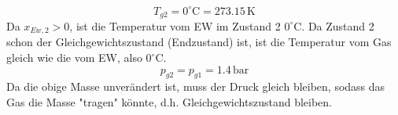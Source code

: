 

\item[b)]
    \[
    T_{g2} = 0^\circ \text{C} = 273.15 \, \text{K}
    \]
    Da \( x_{Ew,2} > 0 \), ist die Temperatur vom EW im Zustand 2 \( 0^\circ \text{C} \). Da Zustand 2 schon der Gleichgewichtszustand (Endzustand) ist, ist die Temperatur vom Gas gleich wie die vom EW, also \( 0^\circ \text{C} \).
    \[
    p_{g2} = p_{g1} = 1.4 \, \text{bar}
    \]
    Da die obige Masse unverändert ist, muss der Druck gleich bleiben, sodass das Gas die Masse "tragen" könnte, d.h. Gleichgewichtszustand bleiben.
